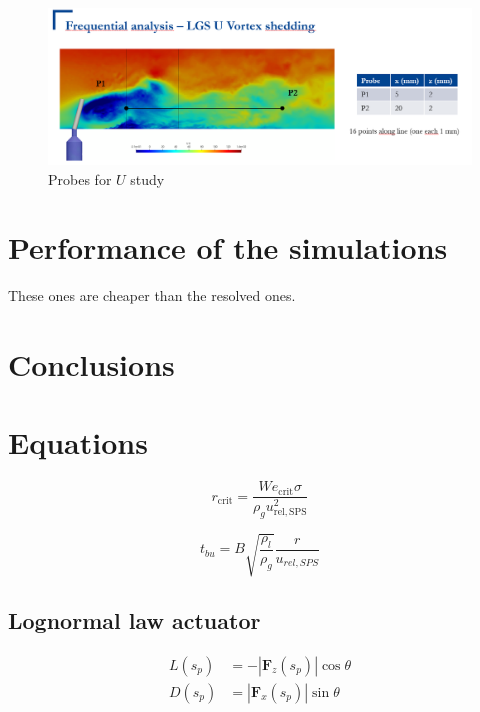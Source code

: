 \begin{figure}[h!]
	\centering
	\includegraphics[scale=0.7]{./part2_developments/figures_ch6_lagrangian_JICF/probes_U_planey0}
	\caption{Probes for $U$ study}
	\label{fig:probes_U_planey0}
\end{figure}

\section{Performance of the simulations}

These ones are cheaper than the resolved ones.



\section{Conclusions}

\clearpage

\section{Equations}

	
\begin{equation}
r_\mathrm{crit} = \frac{We_\mathrm{crit} \sigma}{\rho_g u_\mathrm{rel,SPS}^2}
\end{equation}
	
\begin{equation}
t_{bu} = B \sqrt{\frac{\rho_l}{\rho_g}} \frac{r}{u_{rel,SPS}}
\end{equation}

\subsection{Lognormal law actuator}

\begin{subequations}
\label{eq:ALM_SLI_lift_drag_definitions}
\begin{align}
L \left( s_p \right) &= - |\textbf{F}_z \left( s_p \right) | \cos \theta  \\
D \left( s_p \right) &= |\textbf{F}_x \left( s_p \right) | \sin \theta 
\end{align}
\end{subequations}

